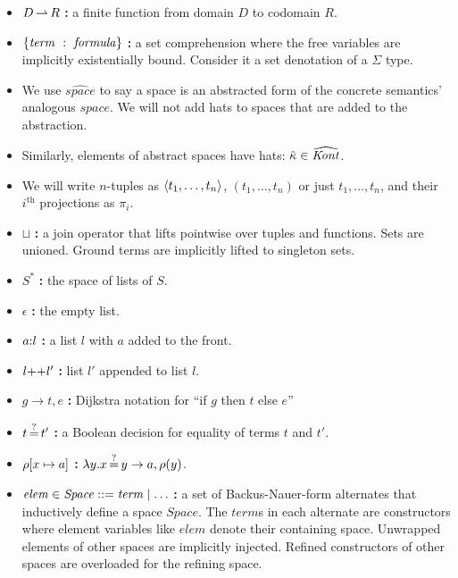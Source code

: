 \begin{itemize}
\item{$D \operatorname*{\rightharpoonup} R$ \textbf{:} a finite function from domain $D$ to codomain $R$.}
\item{$\{ \mathit{term}\ :\ \mathit{formula}\}$ \textbf{:} a set comprehension where the free variables are implicitly existentially bound. Consider it a set denotation of a $\Sigma$ type.}
\item{We use $\widehat{\mathit{space}}$ to say a space is an abstracted form of the concrete semantics' analogous $\mathit{space}$. We will not add hats to spaces that are added to the abstraction.}
\item{Similarly, elements of abstract spaces have hats: \eg{} $\hat{\kappa} \in \widehat{\mathit{Kont}}$.}
\item{We will write $n$-tuples as $\langle t_1,\ldots,t_n \rangle$, $(t_1,\ldots,t_n)$ or just $t_1,\ldots,t_n$, and their $i^\text{th}$ projections as $\pi_i$.}
\item{$\sqcup$ \textbf{:} a join operator that lifts pointwise over tuples and functions. Sets are unioned. Ground terms are implicitly lifted to singleton sets.}
\item{$S^*$ \textbf{:} the space of lists of $S$.}
\item{$\epsilon$ \textbf{:} the empty list.}
\item{$a{\tt :} l$ \textbf{:} a list $l$ with $a$ added to the front.}
\item{$l {\tt ++} l'$ \textbf{:} list $l'$ appended to list $l$.}
\item{$g \to t, e$ \textbf{:} Dijkstra notation for ``if $g$ then $t$ else $e$''}
\item{$t \operatorname*{\overset{?}{=}} t'$ \textbf{:} a Boolean decision for equality of terms $t$ and $t'$.}
\item{$\rho[x \mapsto a]$ \textbf{:} $\lambda y. x \operatorname*{\overset{?}{=}} y \to a, \rho(y)$.}
\item{$\mathit{elem} \in \mathit{Space} ::= \mathit{term} \mathrel{\mid} \ldots$ \textbf{:} a set of Backus-Nauer-form alternates that inductively define a space $\mathit{Space}$. The $\mathit{term}$s in each alternate are constructors where element variables like $\mathit{elem}$ denote their containing space. Unwrapped elements of other spaces are implicitly injected. Refined constructors of other spaces are overloaded for the refining space.

}
\end{itemize}
